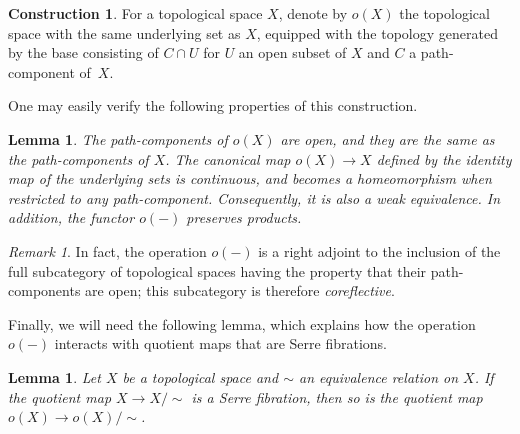 \documentclass[10pt,a4paper]{amsart}
\numberwithin{equation}{section}
\newtheorem{lemm}[theo]{Lemma}
\theoremstyle{definition}
\newtheorem{construction}[theo]{Construction}
\theoremstyle{remark}
\newtheorem{rema}[theo]{Remark}
\newenvironment{enonce}[1]{\begin{construction}}{\end{construction}}
\begin{document}
\begin{enonce}{Construction}\label{construction:open-path-components}
For a topological space $X$, denote by $o(X)$ the topological space with the same underlying set as $X$, equipped with the topology generated by the base consisting of $C \cap U$ for $U$ an open subset of $X$ and $C$ a path-component of~$X$.
\end{enonce}

One may easily verify the following properties of this construction.

\begin{lemm}\label{lem:properties-of-o}
The path-components of $o(X)$ are open, and they are the same as the path-components of $X$. The canonical map $o(X) \to X$ defined by the identity map of the underlying sets is continuous, and becomes a homeomorphism when restricted to any path-component. Consequently, it is also a weak equivalence. In addition, the functor $o(-)$ preserves products.
\end{lemm}

\begin{rema}\label{rmk:coreflective-subcategory}
In fact, the operation $o(-)$ is a right adjoint to the inclusion of the full subcategory of topological spaces having the property that their path-components are open; this subcategory is therefore \emph{coreflective}.
\end{rema}

Finally, we will need the following lemma, which explains how the operation $o(-)$ interacts with quotient maps that are Serre fibrations.

\begin{lemm}\label{lem:open-path-components-Serre-fibrations}
Let $X$ be a topological space and $\sim$ an equivalence relation on $X$. If the quotient map $X \to X/{\sim}$ is a Serre fibration, then so is the quotient map $o(X) \to o(X)/{\sim}$.
\end{lemm}
\end{document}
